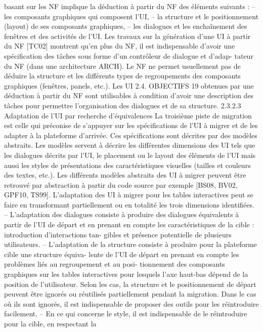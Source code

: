 \documentclass{article}
\begin{document}
basant sur les NF implique la déduction à partir du NF des éléments suivants :
– les composants graphiques qui composent l’UI,
– la structure et le positionnement (layout) de ses composants graphiques,
– les dialogues et les enchaînement des fenêtres et des activités de l’UI.
Les travaux sur la génération d’une UI à partir du NF [TC02] montrent qu’en plus du NF, il est
indispensable d’avoir une spéciﬁcation des tâches sous forme d’un contrôleur de dialogue et d’adap-
tateur du NF (dans une architecture ARCH). Le NF ne permet usuellement pas de déduire la structure
et les différents types de regroupements des composants graphiques (fenêtres, panels, etc.). Les UI
2.4. OBJECTIFS
19
obtenues par une déduction à partir du NF sont utilisables à condition d’avoir une description des
tâches pour permettre l’organisation des dialogues et de sa structure.
2.3.2.3
Adaptation de l’UI par recherche d’équivalences
La troisième piste de migration est celle qui préconise de s’appuyer sur les spéciﬁcations de l’UI
à migrer et de les adapter à la plateforme d’arrivée. Ces spéciﬁcations sont décrites par des modèles
abstraits. Les modèles servent à décrire les différentes dimensions des UI tels que les dialogues décrits
par l’UI, le placement ou le layout des éléments de l’UI mais aussi les styles de présentations des
caractéristiques visuelles (tailles et couleurs des textes, etc.). Les différents modèles abstraits des UI
à migrer peuvent être retrouvé par abstraction à partir du code source par exemple [BS08, BV02,
GPF10, TS99].
L’adaptation des UI à migrer pour les tables interactives peut se faire en transformant partiellement
ou en totalité les trois dimensions identiﬁées.
– L’adaptation des dialogues consiste à produire des dialogues équivalents à partir de l’UI de
départ et en prenant en compte les caractéristiques de la cible : introduction d’interactions tan-
gibles et présence potentielle de plusieurs utilisateurs.
– L’adaptation de la structure consiste à produire pour la plateforme cible une structure équiva-
lente de l’UI de départ en prenant en compte les problèmes liés au regroupement et au posi-
tionnement des composants graphiques sur les tables interactives pour lesquels l’axe haut-bas
dépend de la position de l’utilisateur. Selon les cas, la structure et le positionnement de départ
peuvent être ignorés ou réutilisés partiellement pendant la migration. Dans le cas où ils sont
ignorés, il est indispensable de proposer des outils pour les réintroduire facilement.
– En ce qui concerne le style, il est indispensable de le réintroduire pour la cible, en respectant la
\end{document}

